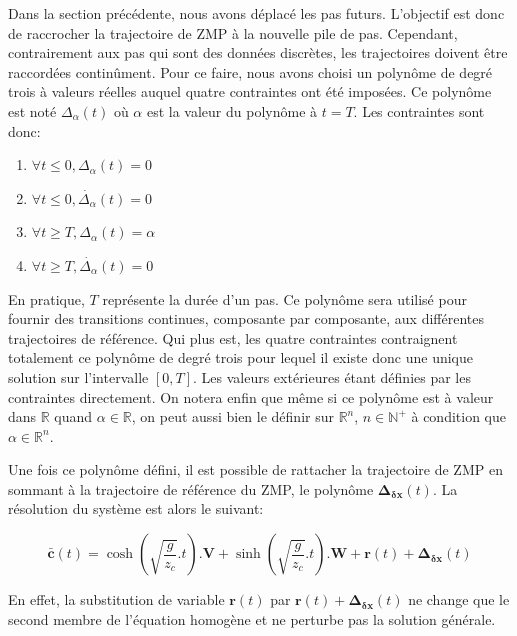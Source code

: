 Dans la section précédente, nous avons déplacé les pas
futurs. L'objectif est donc de raccrocher la trajectoire de ZMP à la
nouvelle pile de pas. Cependant, contrairement aux pas qui sont des
données discrètes, les trajectoires doivent être raccordées
continûment. Pour ce faire, nous avons choisi un polynôme de degré
trois à valeurs réelles auquel quatre contraintes ont été imposées. Ce
polynôme est noté $\Delta_\alpha(t)$ où $\alpha$ est la valeur du
polynôme à $t=T$. Les contraintes sont donc:


\begin{enumerate}
\item $\forall t \leq 0, \Delta_\alpha(t) = 0$
\item $\forall t \leq 0, \dot{\Delta_\alpha}(t) = 0$
\item $\forall t \geq T, \Delta_\alpha(t) = \alpha$
\item $\forall t \geq T, \dot{\Delta_\alpha}(t) = 0$
\end{enumerate}

En pratique, $T$ représente la durée d'un pas. Ce polynôme sera
utilisé pour fournir des transitions continues, composante par
composante, aux différentes trajectoires de référence. Qui plus est,
les quatre contraintes contraignent totalement ce polynôme de degré
trois pour lequel il existe donc une unique solution sur l'intervalle
$[0,T]$. Les valeurs extérieures étant définies par les contraintes
directement. On notera enfin que même si ce polynôme est à valeur dans
$\mathbb{R}$ quand $\alpha \in \mathbb{R}$, on peut aussi bien le
définir sur $\mathbb{R}^n$, $n \in \mathbb{N}^+$ à condition que
$\alpha \in \mathbb{R}^n$.


Une fois ce polynôme défini, il est possible de rattacher la
trajectoire de ZMP en sommant à la trajectoire de référence du
ZMP, le polynôme
$\mathbf{\Delta}_{\mathbf{\delta {x}}}(t)$. La résolution du système
est alors le suivant:

\begin{equation} \label{eq:zmpsolcor}
  \bar{\mathbf{c}}(t) = \cosh(\sqrt{\frac{g}{z_c}}.t) . \mathbf{V} +
  \sinh(\sqrt{\frac{g}{z_c}}.t) . \mathbf{W} + \mathbf{r}(t) + \mathbf{\Delta}_{\mathbf{\delta {x}}}(t)
\end{equation}

En effet, la substitution de variable $\mathbf{r}(t)$ par
$\mathbf{r}(t) + \mathbf{\Delta}_{\mathbf{\delta {x}}}(t)$ ne change
que le second membre de l'équation homogène et ne perturbe pas la
solution générale.

